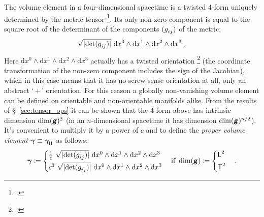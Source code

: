 \documentclass[\ifafour a4paper,12pt,\else a5paper,10pt,\fi%
onecolumn,oneside,article,%
british%
]{memoir}
\makeatletter
\newcommand*{\mathquote}[1]{`\,#1\,'}
\theoremstyle{remark}
\theoremstyle{innote}
\newcommand*{\mathte}[1]{\textbf{\textit{\textsf{#1}}}}
\newcommand*{\citep}{\footcites}
\newcommand*{\delt}{\deltaup}%
\newcommand*{\di}{\mathrm{d}}%
\newcommand*{\defd}{\coloneqq}
\DeclarePairedDelimiter\abs{\lvert}{\rvert}
\renewcommand*{\|}[1][]{\nonscript\,#1\vert\nonscript\;\mathopen{}}
\newcommand*{\sect}{\S}%
\newcommand*{\chap}{ch.}%
\newcommand*{\q}{}%
\DeclareRobustCommand*{\q}{%
  \mathord{\mathpalette\bigcdot@{}}%
}
\newcommand*{\bigcdot@scalefactor}{0.7}
\newcommand*{\bigcdot@widthfactor}{1.5}
\newcommand*{\bigcdot@}[2]{%
  \sbox0{$#1\vcenter{}$}%
  \sbox2{$#1\cdot\m@th$}%
  \hbox to \bigcdot@widthfactor\wd2{%
    \hfil
    \raise\ht0\hbox{%
      \scalebox{\bigcdot@scalefactor}{%
        \lower\ht0\hbox{$#1\bullet\m@th$}%
      }%
    }%
    \hfil
  }%
}
\newcommand*{\Le}{\textsf{L}}
\newcommand*{\Ti}{\textsf{T}}
\newcommand*{\yg}{\mathte{g}}
\renewcommand*{\i}{\indices}
\newcommand*{\dix}[1][i]{\di x^{#1}}
\newcommand*{\ye}{\bm{e}}
\newcommand*{\ygv}{\bm{\gamma}}
\newcommand*{\rul}{{\mkern2mu\rule[-0.1ex]{0.75pt}{1.1ex}\mkern2mu}}
\DeclarePairedDelimiter\mul{\rul}{\rul}%
\makeatother
\begin{document}
\medskip



The volume element in a four-dimensional spacetime is a twisted 4-form
uniquely determined by the metric tensor
\citep[\sect~V.24]{derham1955_t1984}[\sect~V.A.4]{choquetbruhatetal1977_r1996}[\sect~6.2]{abrahametal1983_r1988}.
Its only non-zero component is equal to the square root of the determinant
of the %
components $(g\i{_{ij}})$ of the metric:
\begin{equation*}
  \label{eq:undim_volume_elem}
  \sqrt{\smash[b]{\abs{\det(g\i{_{ij}})}}}\ \dix[0]\land\dix[1]\land\dix[2]\land\dix[3] \ .
\end{equation*}
Here
$\dix[0]\land\dix[1]\land\dix[2]\land\dix[3]$ %
actually has a twisted orientation \citep[\chap~6 p.~60,
\chap~9]{frankel1979} (the coordinate transformation of the non-zero
component includes the sign of the Jacobian), which in this case means that
it has no screw-sense orientation at all, only an abstract \mathquote{$+$}
orientation. For this reason a globally non-vanishing volume element can be
defined on orientable and non-orientable manifolds alike. From the results
of \sect~\ref{sec:tensor_ops} it can be shown that the 4-form above has
intrinsic dimension $\dim(\yg)^{2}$ (in an $n$-dimensional spacetime it has
dimension $\dim(\yg)^{n/2}$). It's convenient to multiply it by a power of
$c$ and to define the \emph{proper volume element}
$\ygv \equiv \ygv\i{_{\mul{\q\q\q\q}}}$ as follows:
\begin{equation}
  \label{eq:volume_elem}
  \ygv \defd
      \begin{cases}
        \frac{1}{c}\
        \sqrt{\smash[b]{\abs{\det(g\i{_{ij}})}}}\ \dix[0]\land\dix[1]\land\dix[2]\land\dix[3] 
     \\[\jot]
        c^{3}\
        \sqrt{\smash[b]{\abs{\det(g\i{_{ij}})}}}\ \dix[0]\land\dix[1]\land\dix[2]\land\dix[3] 
  \end{cases}
  \text{if }\dim(\yg)\defd
  \begin{cases}
    \Le^2 \\[\jot]
     \Ti^2
  \end{cases}.
\end{equation}
\end{document}
